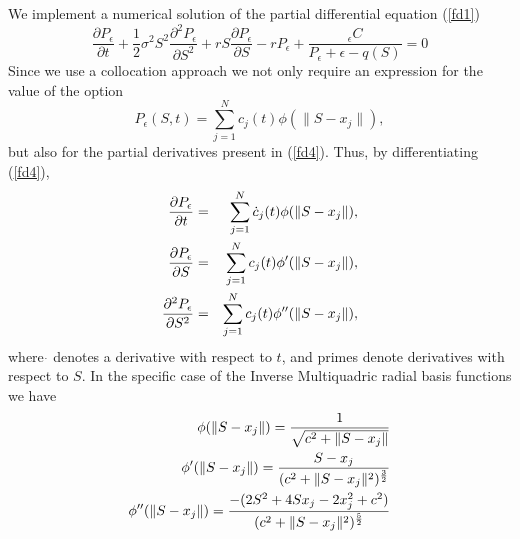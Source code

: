\documentclass[12pt]{article}
\numberwithin{equation}{subsection} %
\begin{document}
We implement a numerical solution of the partial differential
equation (\ref{fd1})
$$
\frac{\partial P_\epsilon}{\partial
t}+\frac{1}{2}\sigma^2S^2\frac{\partial^2 P_\epsilon}{\partial S^2}
+rS\frac{\partial P_\epsilon}{\partial
S}-rP_\epsilon+\frac{_\epsilon C }{P_\epsilon + \epsilon - q(S)}=0
$$
Since we use a collocation approach we not only require an
expression for the value of the option
\begin{equation}\label{fd4}
P_\epsilon (S,t) = \sum_{j=1}^N c_j(t) \phi(\|S-x_j\|),
\end{equation}
but also for the partial derivatives present in (\ref{fd4}). Thus,
by differentiating (\ref{fd4}),
\begin{eqnarray*}
\frac{\partial P_\epsilon}{\partial t} & = & \sum_{j=1}^N
\dot{c}_j(t) \phi(\|S-x_j\|), \cr \frac{\partial
P_\epsilon}{\partial S} & = & \sum_{j=1}^N c_j(t) \phi'(\|S-x_j\|),
\cr \frac{\partial^{2} P_\epsilon}{\partial S^{2}} & = &
\sum_{j=1}^N c_j(t) \phi''(\|S-x_j\|),
\end{eqnarray*}
where $\dot{}$ denotes a derivative with respect to $t$, and primes
denote derivatives with respect to $S$. In the specific case of the
Inverse Multiquadric radial basis functions we have\cite{Fas02}
\begin{eqnarray*}
\phi(\|S-x_j\|)= \frac{1}{\sqrt{c^2+\|S-x_j\|}}\\ \vspace{10mm}
\phi'(\|S-x_j\|)=\frac{S-x_j}{(c^2+\|S-x_j\|^2)^\frac{3}{2}}\\\vspace{10mm}
\phi''(\|S-x_j\|)=\frac{-(2S^2+4Sx_j-2x_j^2+c^2)}{(c^2+\|S-x_j\|^2)^\frac{5}{2}}
\end{eqnarray*}
\end{document}
